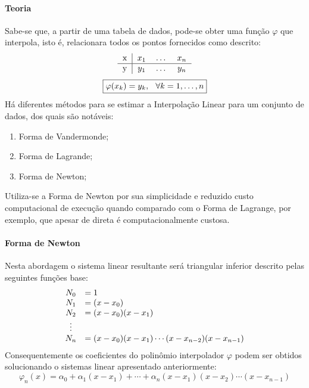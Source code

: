 \documentclass{article}
\begin{document}
            \paragraph{Teoria}Sabe-se que, a partir de uma tabela de dados, pode-se obter uma função $\varphi$ que interpola, isto é, relacionara todos os pontos fornecidos como descrito:
            \[
                \begin{tabular}{c | c c c}
                    x & $x_{1}$ & \dots & $x_{n}$\\ \hline
                    y & $y_{1}$ & \dots & $y_{n}$
                \end{tabular}
            \]
            \begin{equation}
                \boxed{\varphi(x_{k}) = y_{k}, \hspace{2.5mm} \forall k = 1, \dots, n}
            \end{equation}
        Há diferentes métodos para se estimar a Interpolação Linear para um conjunto de dados, dos quais são notáveis:
            \begin{enumerate}[noitemsep]
                \item Forma de Vandermonde;
                \item Forma de Lagrande;
                \item Forma de Newton;
            \end{enumerate}
        Utiliza-se a Forma de Newton por sua simplicidade e reduzido custo computacional de execução quando comparado com o Forma de Lagrange, por exemplo, que apesar de direta é computacionalmente custosa.

        \paragraph{Forma de Newton}Nesta abordagem o sistema linear resultante será triangular inferior descrito pelas seguintes funções base:
            \[
                \begin{array}{c l}
                    N_{0} & = 1\\
                    N_{1} & = (x - x_{0})\\
                    N_{2} & = (x - x_{0})(x - x_{1})\\
                    \vdots&\\
                    N_{n} & = (x - x_{0})(x - x_{1})\cdots(x - x_{n-2})(x - x_{n-1})\\
                \end{array}
            \]
        Consequentemente os coeficientes do polinômio interpolador $\varphi$ podem ser obtidos solucionando o sistemas linear apresentado anteriormente:
            \[\boxed{\varphi_{n}(x) = \alpha_{0} + \alpha_{1}(x - x_{1}) + \cdots + \alpha_{n}(x - x_{1})(x - x_{2})\cdots(x - x_{n-1})}\]
\end{document}
